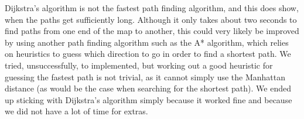 Dijkstra's algorithm is not the fastest path finding algorithm, and this does show, when the paths get sufficiently long. Although it only takes about two seconds to find paths from one end of the map to another, this could very likely be improved by using another path finding algorithm such as the A* algorithm, which relies on heuristics to guess which direction to go in order to find a shortest path. We tried, unsuccessfully, to implemented, but working out a good heuristic for guessing the fastest path is not trivial, as it cannot simply use the Manhattan distance (as would be the case when searching for the shortest path). We ended up sticking with Dijkstra's algorithm simply because it worked fine and because we did not have a lot of time for extras.